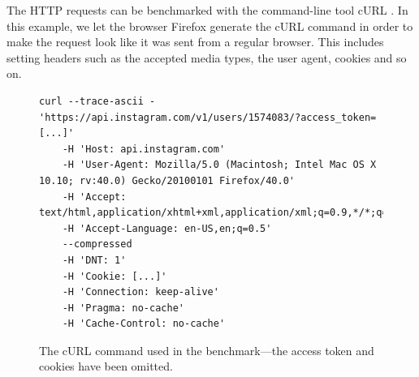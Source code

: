 \documentclass{cslthse-msc}
\begin{document}
The HTTP requests can be benchmarked with the command-line tool cURL \cite{curl}. In this example, we let the browser Firefox generate the cURL command in order to make the request look like it was sent from a regular browser. This includes setting headers such as the accepted media types, the user agent, cookies and so on.


\begin{figure}[H]
  \centering
\begin{lstlisting}[breaklines=true]
curl --trace-ascii - 'https://api.instagram.com/v1/users/1574083/?access_token=[...]' 
	-H 'Host: api.instagram.com' 
	-H 'User-Agent: Mozilla/5.0 (Macintosh; Intel Mac OS X 10.10; rv:40.0) Gecko/20100101 Firefox/40.0' 
	-H 'Accept: text/html,application/xhtml+xml,application/xml;q=0.9,*/*;q=0.8' 
	-H 'Accept-Language: en-US,en;q=0.5' 
	--compressed 
	-H 'DNT: 1' 
	-H 'Cookie: [...]' 
	-H 'Connection: keep-alive' 
	-H 'Pragma: no-cache' 
	-H 'Cache-Control: no-cache'
\end{lstlisting}
  \caption{The cURL command used in the benchmark---the access token and cookies have been omitted.}
\end{figure}

\clearpage
\end{document}
